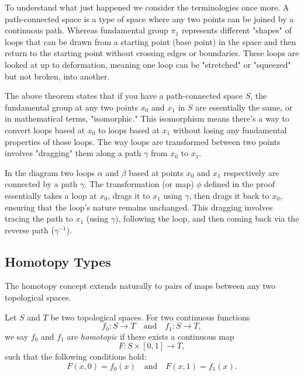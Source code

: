 \documentclass{article}
\begin{document}

To understand what just happened we consider the terminologies once more. A path-connected space is a type of space where any two points can be joined by a continuous path. Whereas fundamental group \(\pi_1\) represents different "shapes" of loops that can be drawn from a starting point (base point) in the space and then return to the starting point without crossing edges or boundaries. These loops are looked at up to deformation, meaning one loop can be "stretched" or "squeezed" but not broken, into another.

The above theorem states that if you have a path-connected space \(S\), the fundamental group at any two points \(x_0\) and \(x_1\) in \(S\) are essentially the same, or in mathematical terms, "isomorphic." This isomorphism means there's a way to convert loops based at \(x_0\) to loops based at \(x_1\) without losing any fundamental properties of those loops. The way loops are transformed between two points involves "dragging" them along a path \(\gamma\) from \(x_0\) to \(x_1\).

In the diagram two loops \(\alpha\) and \(\beta\) based at points \(x_0\) and \(x_1\) respectively are connected by a path \(\gamma\). The transformation (or map) \(\phi\) defined in the proof essentially takes a loop at \(x_0\), drags it to \(x_1\) using \(\gamma\), then drags it back to \(x_0\), ensuring that the loop's nature remains unchanged. This dragging involves tracing the path to \(x_1\) (using \(\gamma\)), following the loop, and then coming back via the reverse path (\(\gamma^{-1}\)).

\subsection{Homotopy Types} 
The homotopy concept extends naturally to pairs of maps between any two topological spaces.

\begin{theorem}

 Let \(S\) and \(T\) be two topological spaces. For two continuous functions
\[
f_0: S \rightarrow T \quad \text{and} \quad f_1: S \rightarrow T,
\]
we say \(f_0\) and \(f_1\) are \textit{homotopic} if there exists a continuous map
\[
F: S \times [0, 1] \rightarrow T,
\]
such that the following conditions hold:
\[
F(x, 0) = f_0(x) \quad \text{and} \quad F(x, 1) = f_1(x).
\]
\end{theorem}
\end{document}
